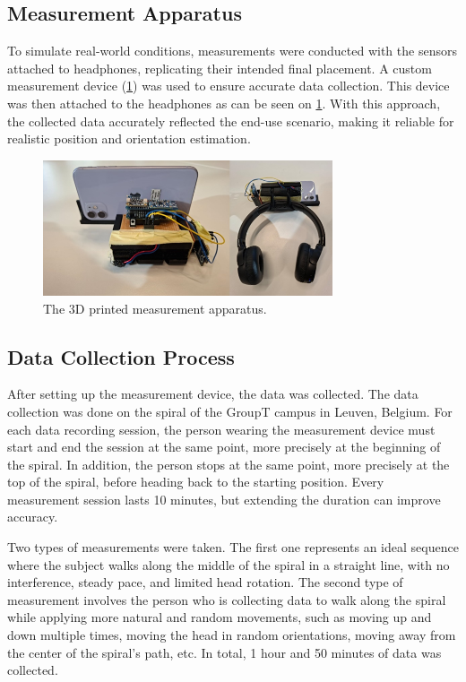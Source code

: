 \subsection{Measurement Apparatus}
To simulate real-world conditions, measurements were conducted with the sensors attached to headphones, replicating their intended final placement. A custom measurement device (\cref{measurementapparatus}) was used to ensure accurate data collection. This device was then attached to the headphones as can be seen on \cref{measurementapparatus}. With this approach, the collected data accurately reflected the end-use scenario, making it reliable for realistic position and orientation estimation.

\begin{figure}[h] 
	\centering \includegraphics[height=4cm]{./images/apparatus.png}
	\caption{The 3D printed measurement apparatus.}
	\label{measurementapparatus}
\end{figure}

\subsection{Data Collection Process}
After setting up the measurement device, the data was collected. The data collection was done on the spiral of the GroupT campus in Leuven, Belgium. For each data recording session, the person wearing the measurement device must start and end the session at the same point, more precisely at the beginning of the spiral. In addition, the person stops at the same point, more precisely at the top of the spiral, before heading back to the starting position. Every measurement session lasts 10 minutes, but extending the duration can improve accuracy.
\par
Two types of measurements were taken. The first one represents an ideal sequence where the subject walks along the middle of the spiral in a straight line, with no interference, steady pace, and limited head rotation. The second type of measurement involves the person who is collecting data to walk along the spiral while applying more natural and random movements, such as moving up and down multiple times, moving the head in random orientations, moving away from the center of the spiral's path, etc. In total, 1 hour and 50 minutes of data was collected.

